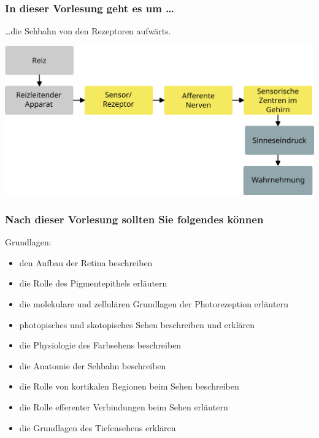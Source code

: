 \documentclass{beamer}
\begin{document}
 
\begin{frame}

 \frametitle{In dieser Vorlesung geht es um \dots}

\dots die Sehbahn von den Rezeptoren aufwärts.

\begin{center}
    \includegraphics[width=\textwidth]{wahrnehmungsprozess_ohne_beispiel_ab_sensor.png}
\end{center}



\end{frame}


 
\begin{frame}

 \frametitle{Nach dieser Vorlesung sollten Sie folgendes können}



\begin{block}{Grundlagen:}




\begin{itemize}

    \item 
den Aufbau der Retina beschreiben
    \item 
die Rolle des Pigmentepithels erläutern
    \item 
die molekulare und zellulären Grundlagen der Photorezeption erläutern
    \item 
photopisches und skotopisches Sehen beschreiben und erklären
    \item 
die Physiologie des Farbsehens beschreiben
    \item 
die Anatomie der Sehbahn beschreiben
    \item 
die Rolle von kortikalen Regionen beim Sehen beschreiben
    \item 
die Rolle efferenter Verbindungen beim Sehen erläutern
    \item 
die Grundlagen des Tiefensehens erklären
\end{itemize}


\end{block}

\end{frame}
\end{document}
